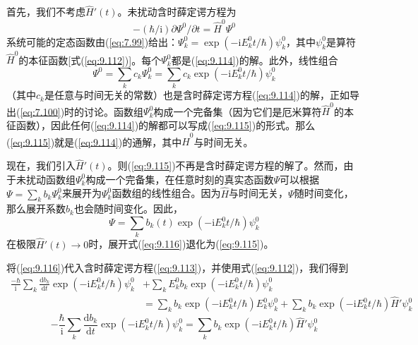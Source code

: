     首先，我们不考虑$\hat{H}'\left(t\right)$。未扰动含时薛定谔方程为
    \begin{equation}
        -\left(\hbar/\mathrm{i}\right)\partial \Psi^0/\partial t = \hat{H}^0 \Psi^0
        \label{eq:9.114}
    \end{equation}
    系统可能的定态函数由(\ref{eq:7.99})给出：$\Psi^0_k = \exp\left(-\mathrm{i}E_k^0t/\hbar\right)\psi_k^0$，其中$\psi_k^0$是算符$\hat{H}^0$的本征函数[式(\ref{eq:9.112})]。每个$\Psi^0_k$都是(\ref{eq:9.114})的解。此外，线性组合
    \begin{equation}
        \Psi^0 = \sum_k c_k \Psi^0_k = \sum_k c_k \exp\left(-\mathrm{i}E_k^0t/\hbar\right)\psi_k^0
        \label{eq:9.115}
    \end{equation}
    （其中$c_k$是任意与时间无关的常数）也是含时薛定谔方程(\ref{eq:9.114})的解，正如导出(\ref{eq:7.100})时的讨论。函数组$\Psi_k^0$构成一个完备集（因为它们是厄米算符$\hat{H}^0$的本征函数），因此任何(\ref{eq:9.114})的解都可以写成(\ref{eq:9.115})的形式。那么(\ref{eq:9.115})就是(\ref{eq:9.114})的通解，其中$\hat{H}^0$与时间无关。

    现在，我们引入$\hat{H}'\left(t\right)$。则(\ref{eq:9.115})不再是含时薛定谔方程的解了。然而，由于未扰动函数组$\Psi_k^0$构成一个完备集，在任意时刻的真实态函数$\Psi$可以根据$\Psi = \sum_k b_k \Psi_k^0$来展开为$\Psi_k^0$函数组的线性组合。因为$\hat{H}$与时间无关，$\Psi$随时间变化，那么展开系数$b_k$也会随时间变化。因此，
    \begin{equation}
        \Psi = \sum_k b_k\left(t\right) \exp\left(-\mathrm{i}E_k^0t/\hbar\right)\psi_k^0
        \label{eq:9.116}
    \end{equation}
    在极限$\hat{H}'\left(t\right) \to 0$时，展开式(\ref{eq:9.116})退化为(\ref{eq:9.115})。

    将(\ref{eq:9.116})代入含时薛定谔方程(\ref{eq:9.113})，并使用式(\ref{eq:9.112})，我们得到
    \begin{equation*}
        \begin{aligned}
            \frac{-\hbar}{\mathrm{i}} \sum_k \frac{\mathrm{d} b_k}{\mathrm{d}t} \exp \left( -\mathrm{i} E_k^0 t/\hbar \right) \psi_k^0 &+ \sum_k E_k^0 b_k \exp \left( -\mathrm{i} E_k^0 t/\hbar \right) \psi_k^0 \\
            &= \sum_k b_k \exp \left( -\mathrm{i} E_k^0 t/\hbar \right) E_k^0 \psi_k^0 + \sum_k b_k \exp \left( -\mathrm{i} E_k^0 t/\hbar \right) \hat{H}'\psi_k^0
        \end{aligned}
    \end{equation*}
    \begin{equation*}
        - \frac{\hbar}{\mathrm{i}}\sum_k \frac{\mathrm{d} b_k}{\mathrm{d}t} \exp \left( -\mathrm{i} E_k^0 t/\hbar \right) \psi_k^0 = \sum_k b_k \exp \left( -\mathrm{i} E_k^0 t/\hbar \right) \hat{H}'\psi_k^0
    \end{equation*}



